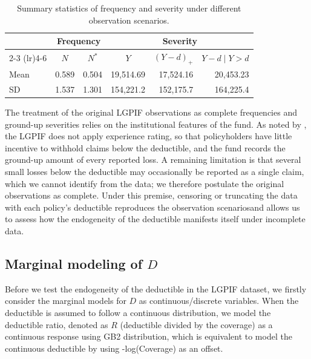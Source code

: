 \documentclass[11pt]{article}
\begin{document}
{ %

\begin{table}[h!]
\centering
\begin{tabular}{lrrrrr}
\toprule
& \multicolumn{2}{c}{Frequency}
& \multicolumn{3}{c}{Severity} \\
\cmidrule(lr){2-3}
\cmidrule(lr){4-6}
&  \multicolumn{1}{c}{$N$} & \multicolumn{1}{c}{$N^*$} & \multicolumn{1}{c}{$Y$} & \multicolumn{1}{c}{$(Y-d)_+$}
& \multicolumn{1}{c}{$Y-d\mid Y>d$} \\
\midrule
Mean
& 0.589 & 0.504 & 19,514.69
& 17,524.16 & 20,453.23 \\
SD
& 1.537 & 1.301 & 154,221.2
& 152,175.7 & 164,225.4 \\
\bottomrule
\end{tabular}
\caption{Summary statistics of frequency and severity
under different observation scenarios.}
\label{tab:data summary}
\end{table}

{The treatment of the original LGPIF observations as complete frequencies and ground-up severities relies on the institutional features of the fund. As noted by \citet{shi2022copula}, the LGPIF does not apply experience rating, so that policyholders have little incentive to withhold claims below the deductible, and the fund records the ground-up amount of every reported loss. A remaining limitation is that several small losses below the deductible may occasionally be reported as a single claim, which we cannot identify from the data; we therefore postulate the original observations as complete. Under this premise, censoring or truncating the data with each policy's deductible reproduces the observation scenariosand allows us to assess how the endogeneity of the deductible manifests itself under incomplete data.}

\subsection{Marginal modeling of $D$}\label{section:marginalD}

Before we test the endogeneity of the deductible in the LGPIF dataset, we firstly consider the marginal models for $D$ as continuous/discrete variables. When the deductible is assumed to follow a continuous distribution, we  model the deductible ratio, denoted as $R$ (deductible divided by the coverage) as a continuous response using GB2 distribution, which is equivalent to model the continuous deductible by using -log(Coverage) as an offset. 

}
\end{document}

